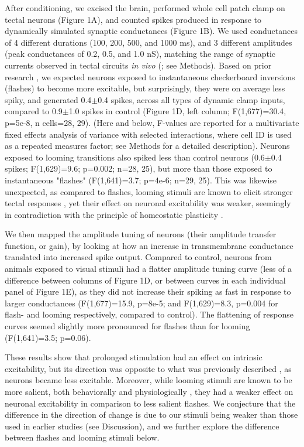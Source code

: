 \documentclass{article}
\begin{document}
After conditioning, we excised the brain, performed whole cell patch clamp on tectal neurons (Figure 1A), and counted spikes produced in response to dynamically simulated synaptic conductances (Figure 1B). We used conductances of 4 different durations (100, 200, 500, and 1000 ms), and 3 different amplitudes (peak conductances of 0.2, 0.5, and 1.0 nS), matching the range of synaptic currents observed in tectal circuits \textit{in vivo} (\citealt{xu2011,khakhalin2014,ciarleglio2015}; see Methods). Based on prior research \citep{aizenman2003,ciarleglio2015}, we expected neurons exposed to instantaneous checkerboard inversions (flashes) to become more excitable, but surprisingly, they were on average less spiky, and generated 0.4$\pm$0.4 spikes, across all types of dynamic clamp inputs, compared to 0.9$\pm$1.0 spikes in control (Figure 1D, left column; F(1,677)=30.4, p=5e-8, n cells=28, 29). (Here and below, F-values are reported for a multivariate fixed effects analysis of variance with selected interactions, where cell ID is used as a repeated measures factor; see Methods for a detailed description). Neurons exposed to looming transitions also spiked less than control neurons (0.6$\pm$0.4 spikes; F(1,629)=9.6; p=0.002; n=28, 25), but more than those exposed to instantaneous "flashes" (F(1,641)=3.7; p=4e-6; n=29, 25). This was likewise unexpected, as compared to flashes, looming stimuli are known to elicit stronger tectal responses \citep{khakhalin2014,khakhalin2019graph}, yet their effect on neuronal excitability was weaker, seemingly in contradiction with the principle of homeostatic plasticity \citep{pratt2007,turrigiano2007}.

We then mapped the amplitude tuning of neurons (their amplitude transfer function, or gain), by looking at how an increase in transmembrane conductance translated into increased spike output. Compared to control, neurons from animals exposed to visual stimuli had a flatter amplitude tuning curve (less of a difference between columns of Figure 1D, or between curves in each individual panel of Figure 1E), as they did not increase their spiking as fast in response to larger conductances (F(1,677)=15.9, p=8e-5; and F(1,629)=8.3, p=0.004 for flash- and looming respectively, compared to control). The flattening of response curves seemed slightly more pronounced for flashes than for looming (F(1,641)=3.5; p=0.06). 

These results show that prolonged stimulation had an effect on intrinsic excitability, but its direction was opposite to what was previously described \citep{aizenman2003,ciarleglio2015}, as neurons became less excitable. Moreover, while looming stimuli are known to be more salient, both behaviorally and physiologically \citep{khakhalin2014}, they had a weaker effect on neuronal excitability in comparison to less salient flashes. We conjecture that the difference in the direction of change is due to our stimuli being weaker than those used in earlier studies (see Discussion), and we further explore the difference between flashes and looming stimuli below.
\end{document}
